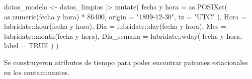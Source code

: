 \documentclass[
  letterpaper,
  DIV=11,
  numbers=noendperiod]{scrartcl}
\newenvironment{Shaded}{\begin{snugshade}}{\end{snugshade}}
\newcommand{\AttributeTok}[1]{\textcolor[rgb]{0.40,0.45,0.13}{#1}}
\newcommand{\ConstantTok}[1]{\textcolor[rgb]{0.56,0.35,0.01}{#1}}
\newcommand{\DecValTok}[1]{\textcolor[rgb]{0.68,0.00,0.00}{#1}}
\newcommand{\FunctionTok}[1]{\textcolor[rgb]{0.28,0.35,0.67}{#1}}
\newcommand{\NormalTok}[1]{\textcolor[rgb]{0.00,0.23,0.31}{#1}}
\newcommand{\OtherTok}[1]{\textcolor[rgb]{0.00,0.23,0.31}{#1}}
\newcommand{\SpecialCharTok}[1]{\textcolor[rgb]{0.37,0.37,0.37}{#1}}
\newcommand{\StringTok}[1]{\textcolor[rgb]{0.13,0.47,0.30}{#1}}
\begin{document}
\begin{Shaded}
\begin{Highlighting}[]
\NormalTok{datos\_modelo }\OtherTok{\textless{}{-}}\NormalTok{ datos\_limpios }\SpecialCharTok{|\textgreater{}}
  \FunctionTok{mutate}\NormalTok{(}
    \StringTok{\textasciigrave{}}\AttributeTok{fecha y hora}\StringTok{\textasciigrave{}} \OtherTok{=} \FunctionTok{as.POSIXct}\NormalTok{(}
      \FunctionTok{as.numeric}\NormalTok{(}\StringTok{\textasciigrave{}}\AttributeTok{fecha y hora}\StringTok{\textasciigrave{}}\NormalTok{) }\SpecialCharTok{*} \DecValTok{86400}\NormalTok{,}
      \AttributeTok{origin =} \StringTok{"1899{-}12{-}30"}\NormalTok{,}
      \AttributeTok{tz =} \StringTok{"UTC"}
\NormalTok{    ),}
    \AttributeTok{Hora =}\NormalTok{ lubridate}\SpecialCharTok{::}\FunctionTok{hour}\NormalTok{(}\StringTok{\textasciigrave{}}\AttributeTok{fecha y hora}\StringTok{\textasciigrave{}}\NormalTok{),}
    \AttributeTok{Dia =}\NormalTok{ lubridate}\SpecialCharTok{::}\FunctionTok{day}\NormalTok{(}\StringTok{\textasciigrave{}}\AttributeTok{fecha y hora}\StringTok{\textasciigrave{}}\NormalTok{),}
    \AttributeTok{Mes =}\NormalTok{ lubridate}\SpecialCharTok{::}\FunctionTok{month}\NormalTok{(}\StringTok{\textasciigrave{}}\AttributeTok{fecha y hora}\StringTok{\textasciigrave{}}\NormalTok{),}
    \AttributeTok{Dia\_semana =}\NormalTok{ lubridate}\SpecialCharTok{::}\FunctionTok{wday}\NormalTok{(}
      \StringTok{\textasciigrave{}}\AttributeTok{fecha y hora}\StringTok{\textasciigrave{}}\NormalTok{,}
      \AttributeTok{label =} \ConstantTok{TRUE}
\NormalTok{    )}
\NormalTok{  )}
\end{Highlighting}
\end{Shaded}

Se construyeron atributos de tiempo para poder encontrar patrones
estacionales en los contaminantes.

\begin{Shaded}
\end{Shaded}
\end{document}
